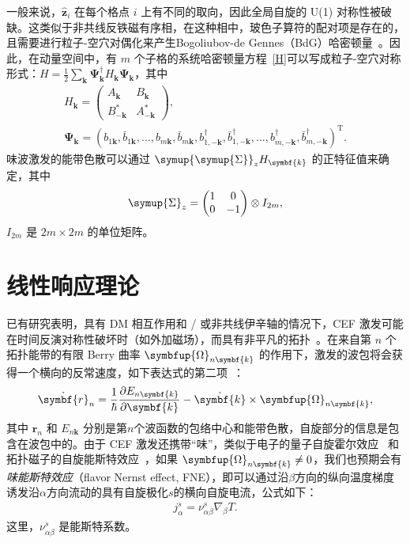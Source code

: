     一般来说，$\hat{\symbf{z}}_i$ 在每个格点 $i$ 上有不同的取向，因此全局自旋的 U(1) 对称性被破缺。这类似于非共线反铁磁有序相，在这种相中，玻色子算符的配对项是存在的，且需要进行粒子-空穴对偶化来产生Bogoliubov-de Gennes（BdG）哈密顿量~\cite{del2004quantum}。因此，在动量空间中，有 $m$ 个子格的系统哈密顿量方程~\eqref{H}可以写成粒子-空穴对称形式：$H=\frac{1}{2}\sum_{\symbf{k}}\symbf{\Psi}_{\symbf{k}}^\dagger H_{\symbf{k}}\symbf{\Psi}_{\symbf{k}}$，其中
    \begin{gather}
        H_{\symbf{k}}=
        \begin{pmatrix}
            A_{\symbf{k}} & B_{\symbf{k}}\\
            B^*_{-\symbf{k}} & A^*_{-\symbf{k}}
        \end{pmatrix},\label{eq:Ham}\\
        \symbf{\Psi}_{\symbf{k}}\!\!=\!\!\left(b_{1{\symbf{k}}},\!\bar{b}_{1{\symbf{k}}},...,b_{m{\symbf{k}}},\!\bar{b}_{m{\symbf{k}}},\!b^\dagger_{1,-{\symbf{k}}},\!\bar{b}^\dagger_{1,-{\symbf{k}}},...,b^\dagger_{m,-{\symbf{k}}},\!\bar{b}^\dagger_{m,-{\symbf{k}}}\right)^{\mathrm{T}}\!.
    \end{gather}
    味波激发的能带色散可以通过 $\symup{\symup{\Sigma}}_z H_{\symbf{k}}$ 的正特征值来确定，其中
    \begin{equation}
        \symup{\Sigma}_z=
        \begin{pmatrix}
            1 & 0\\
            0 & -1
        \end{pmatrix}
        \otimes I_{2m},
    \end{equation}
    $I_{2m}$ 是 $2m\times 2m$ 的单位矩阵。
    
    \section{线性响应理论}
    已有研究表明，具有 DM 相互作用和 / 或非共线伊辛轴的情况下，CEF 激发可能在时间反演对称性破坏时（如外加磁场），而具有非平凡的拓扑~\cite{ma2024upper}。在来自第 $n$ 个拓扑能带的有限 Berry 曲率 $\symbfup{\Omega}_{n{\symbf{k}}}$ 的作用下，激发的波包将会获得一个横向的反常速度，如下表达式的第二项~\cite{xiao2010berry,cheng2016spin}：
    \begin{align}
        \dot{\symbf{r}}_n=\frac{1}{\hbar}\frac{\partial E_{n{\symbf{k}}}}{\partial {\symbf{k}}}-\dot{{\symbf{k}}}\times\symbfup{\Omega}_{n{\symbf{k}}},
    \end{align}
    其中 $\symbf{r}_n$ 和 $E_{n{\symbf{k}}}$ 分别是第$n$个波函数的包络中心和能带色散，自旋部分的信息是包含在波包中的。由于 CEF 激发还携带“味”，类似于电子的量子自旋霍尔效应~\cite{kane2005quantum} 和拓扑磁子的自旋能斯特效应~\cite{cheng2016spin,zyuzin2016Magnon}，如果 $\symbfup{\Omega}_{n{\symbf{k}}}\neq 0$，我们也预期会有\emph{味能斯特效应}（flavor Nernst effect, FNE），即可以通过沿$\beta$方向的纵向温度梯度诱发沿$\alpha$方向流动的具有自旋极化$s$的横向自旋电流，公式如下：
    \begin{align}
        j^s_\alpha=\nu^s_{\alpha\beta}\nabla_\beta T.
    \end{align}
    这里，$\nu^s_{\alpha\beta}$ 是能斯特系数。
    
